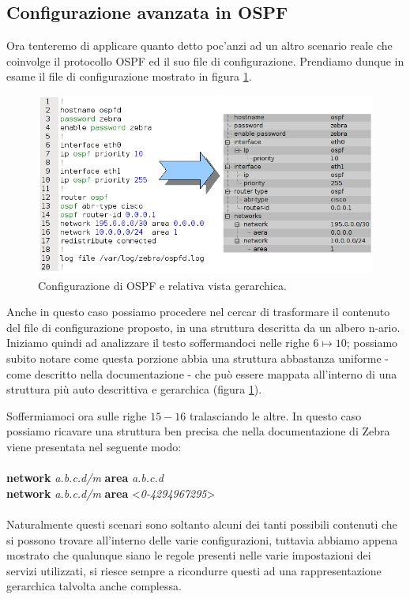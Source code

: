 \subsection{Configurazione avanzata in OSPF}
Ora tenteremo di applicare quanto detto poc'anzi ad un altro scenario reale che coinvolge il protocollo OSPF ed il suo file di configurazione. Prendiamo dunque in esame il file di configurazione mostrato in figura \ref{figura:ospf_conf}.

\begin{figure}[!htb]
	\centering
	\includegraphics[width=12cm]{images/ospf_conf_schema_tree.png}
	\caption{Configurazione di OSPF e relativa vista gerarchica.}
	\label{figura:ospf_conf}
\end{figure}

Anche in questo caso possiamo procedere nel cercar di trasformare il contenuto del file di configurazione proposto, in una struttura descritta da un albero n-ario. Iniziamo quindi ad analizzare il testo soffermandoci nelle righe $6\mapsto10$; possiamo subito notare come questa porzione abbia una struttura abbastanza uniforme - come descritto nella documentazione\cite{ZEBRADOC} - che può essere mappata all'interno di una struttura più auto descrittiva e gerarchica (figura \ref{figura:ospf_conf}).

Soffermiamoci ora sulle righe $15-16$ tralasciando le altre. In questo caso possiamo ricavare una struttura ben precisa che nella documentazione di Zebra viene presentata nel seguente modo:
\\
\\
\textbf{network} \textit{a.b.c.d/m} \textbf{area} \textit{a.b.c.d}
\\
\textbf{network} \textit{a.b.c.d/m} \textbf{area} <\textit{0-4294967295}>
\\
\\
Naturalmente questi scenari sono soltanto alcuni dei tanti possibili contenuti che si possono trovare all'interno delle varie configurazioni, tuttavia abbiamo appena mostrato che qualunque siano le regole presenti nelle varie impostazioni dei servizi utilizzati, si riesce sempre a ricondurre questi ad una rappresentazione gerarchica talvolta anche complessa.

